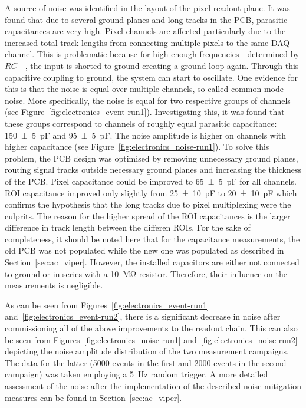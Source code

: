 A source of noise was identified in the layout of the pixel readout plane.
It was found that due to several ground planes and long tracks in the PCB, parasitic capacitances are very high.
Pixel channels are affected particularly due to the increased total track lengths from connecting multiple pixels to the same DAQ channel.
This is problematic because for high enough frequencies---determined by $RC$---, the input is shorted to ground creating a ground loop again.
Through this capacitive coupling to ground, the system can start to oscillate.
One evidence for this is that the noise is equal over multiple channels, so-called common-mode noise.
More specifically, the noise is equal for two respective groups of channels (see Figure~\ref{fig:electronics_event-run1}).
Investigating this, it was found that these groups correspond to channels of roughly equal parasitic capacitance: \SI{150 +- 5}{\pico\farad} and \SI{95 +- 5}{\pico\farad}.
The noise amplitude is higher on channels with higher capacitance (see Figure~\ref{fig:electronics_noise-run1}).
To solve this problem, the PCB design was optimised by removing unnecessary ground planes, routing signal tracks outside necessary ground planes and increasing the thickness of the PCB.
Pixel capacitance could be improved to \SI{65 +- 5}{\pico\farad} for all channels.
ROI capacitance improved only slightly from \SI{25 +- 10}{\pico\farad} to \SI{20 +- 10}{\pico\farad} which confirms the hypothesis that the long tracks due to pixel multiplexing were the culprits.
The reason for the higher spread of the ROI capacitances is the larger difference in track length between the differen ROIs.
For the sake of completeness, it should be noted here that for the capacitance measurements, the old PCB was not populated while the new one was populated as described in Section~\ref{sec:ac_viper}.
However, the installed capacitors are either not connected to ground or in series with a \SI{10}{\mega\ohm} resistor.
Therefore, their influence on the measurements is negligible.

As can be seen from Figures~\ref{fig:electronics_event-run1} and~\ref{fig:electronics_event-run2}, there is a significant decrease in noise after commissioning all of the above improvements to the readout chain.
This can also be seen from Figures~\ref{fig:electronics_noise-run1} and~\ref{fig:electronics_noise-run2} depicting the noise amplitude distribution of the two measurement campaigns.
The data for the latter (\num{5000} events in the first and \num{2000} events in the second campaign) was taken employing a \SI{5}{\hertz} random trigger.
A more detailed assessment of the noise after the implementation of the described noise mitigation measures can be found in Section~\ref{sec:ac_viper}.

